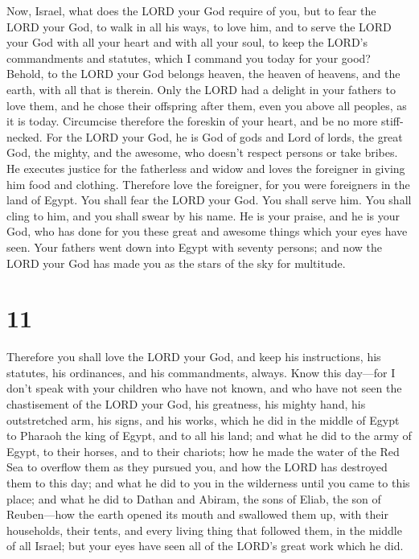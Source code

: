  Now, Israel, what does the LORD your God require of you,
but to fear the LORD your God, to walk in all his ways, to love him, and
to serve the LORD your God with all your heart and with all your soul,
 to keep the LORD's commandments and statutes, which I
command you today for your good?  Behold, to the LORD
your God belongs heaven, the heaven of heavens, and the earth, with all
that is therein.  Only the LORD had a delight in your
fathers to love them, and he chose their offspring after them, even you
above all peoples, as it is today.  Circumcise therefore
the foreskin of your heart, and be no more stiff-necked. 
For the LORD your God, he is God of gods and Lord of lords, the great
God, the mighty, and the awesome, who doesn't respect persons or take
bribes.  He executes justice for the fatherless and widow
and loves the foreigner in giving him food and clothing. 
Therefore love the foreigner, for you were foreigners in the land of
Egypt.  You shall fear the LORD your God. You shall serve
him. You shall cling to him, and you shall swear by his name.
 He is your praise, and he is your God, who has done for
you these great and awesome things which your eyes have seen.
 Your fathers went down into Egypt with seventy persons;
and now the LORD your God has made you as the stars of the sky for
multitude.

\hypertarget{section-10}{%
\section{11}\label{section-10}}

 Therefore you shall love the LORD your God, and keep his
instructions, his statutes, his ordinances, and his commandments,
always.  Know this day---for I don't speak with your
children who have not known, and who have not seen the chastisement of
the LORD your God, his greatness, his mighty hand, his outstretched arm,
 his signs, and his works, which he did in the middle of
Egypt to Pharaoh the king of Egypt, and to all his land; 
and what he did to the army of Egypt, to their horses, and to their
chariots; how he made the water of the Red Sea to overflow them as they
pursued you, and how the LORD has destroyed them to this day;
 and what he did to you in the wilderness until you came
to this place;  and what he did to Dathan and Abiram, the
sons of Eliab, the son of Reuben---how the earth opened its mouth and
swallowed them up, with their households, their tents, and every living
thing that followed them, in the middle of all Israel; 
but your eyes have seen all of the LORD's great work which he did.

